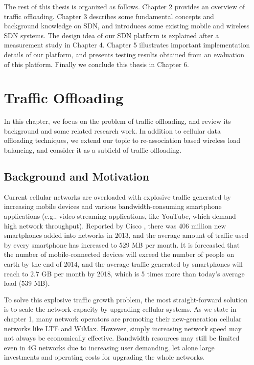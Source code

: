 \documentclass[english]{tktltiki}
\begin{document}
The rest of this thesis is organized as follows. Chapter 2 provides an overview of traffic offloading. Chapter 3 describes some fundamental concepts and background knowledge on SDN, and introduces some existing mobile and wireless SDN systems. The design idea of our SDN platform is explained after a measurement study in Chapter 4. Chapter 5 illustrates important implementation details of our platform, and presents testing results obtained from an evaluation of this platform. Finally we conclude this thesis in Chapter 6.

\newpage

\section{Traffic Offloading}

In this chapter, we focus on the problem of traffic offloading, and review its background and some related research work. In addition to cellular data offloading techniques, we extend our topic to re-association based wireless load balancing, and consider it as a subfield of traffic offloading.

\subsection{Background and Motivation}

Current cellular networks are overloaded with explosive traffic generated by increasing mobile devices and various bandwidth-consuming smartphone applications (e.g., video streaming applications, like YouTube, which demand high network throughput). Reported by Cisco \cite{cisco14}, there was 406 million new smartphones added into networks in 2013, and the average amount of traffic used by every smartphone has increased to 529 MB per month. It is forecasted that the number of mobile-connected devices will exceed the number of people on earth by the end of 2014, and the average traffic generated by smartphones will reach to 2.7 GB per month by 2018, which is 5 times more than today's average load (539 MB).

To solve this explosive traffic growth problem, the most straight-forward solution is to scale the network capacity by upgrading cellular systems. As we state in chapter 1, many network operators are promoting their new-generation cellular networks like LTE and WiMax. However, simply increasing network speed may not always be economically effective. Bandwidth resources may still be limited even in 4G networks due to increasing user demanding, let alone large investments and operating costs for upgrading the whole networks.
\end{document}
